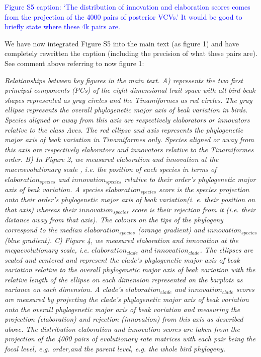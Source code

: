 \documentclass[12pt,letterpaper]{article}
\begin{document}
{\newpage

\textcolor{blue}{Figure S5 caption: ‘The distribution of innovation and elaboration scores comes from the projection of the 4000 pairs of posterior VCVs.’ It would be good to briefly state where these 4k pairs are.}

We have now integrated Figure S5 into the main text (as figure 1) and have completely rewritten the caption (including the precision of what these pairs are). See comment above referring to now figure 1:


\noindent\textit{Relationships between key figures in the main text.
A) represents the two first principal components (PCs) of the eight dimensional trait space with all bird beak shapes represented as gray circles and the Tinamiformes as red circles.
The gray ellipse represents the overall phylogenetic major axis of beak variation in birds.
Species aligned or away from this axis are respectively elaborators or innovators relative to the class Aves.
The red ellipse and axis represents the phylogenetic major axis of beak variation in Tinamiformes only.
Species aligned or away from this axis are respectively elaborators and innovators relative to the Tinamiformes order.
B) In Figure 2, we measured elaboration and innovation at the macroevolutionary scale , i.e. the position of each species in terms of $elaboration_{species}$ and $innovation_{species}$ relative to their order's phylogenetic major axis of beak variation.
A species $elaboration_{species}$ score is the species projection onto their order's phylogenetic major axis of beak variation(i. e. their position on that axis) whereas their $innovation_{species}$ score is their rejection from it (i.e. their distance away from that axis).
The colours on the tips of the phylogeny correspond to the median $elaboration_{species}$ (orange gradient) and $innovation_{species}$ (blue gradient).
C) Figure 4, we measured elaboration and innovation at the megaevolutionary scale, i.e. $elaboration_{clade}$ and $innovation_{clade}$.
The ellipses are scaled and centered and represent the clade's phylogenetic major axis of beak variation relative to the overall phylogenetic major axis of beak variation with the relative length of the ellipse on each dimension represented on the barplots as variance on each dimension.
A clade's $elaboration_{clade}$ and $innovation_{clade}$ scores are measured by projecting the clade's phylogenetic major axis of beak variation onto the overall phylogenetic major axis of beak variation and measuring the projection (elaboration) and rejection (innovation) from this axis as described above.
The distribution elaboration and innovation scores are taken from the projection of the 4000 pairs of evolutionary rate matrices with each pair being the focal level, e.g. order,and the parent level, e.g. the whole bird phylogeny.}


}
\end{document}
